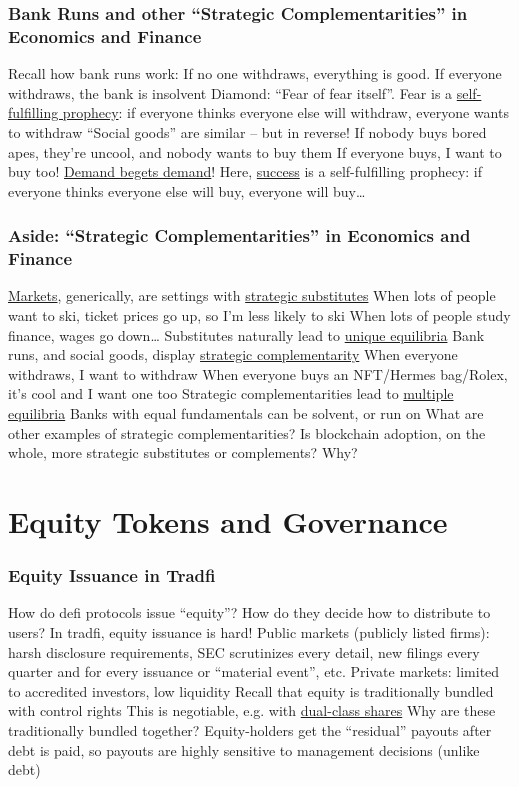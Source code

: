 \documentclass[]{beamer}
\begin{document}
\begin{frame}
\frametitle{Bank Runs and other ``Strategic Complementarities'' in Economics and Finance}

\bi
\m Recall how bank runs work:
\bi
\m If no one withdraws, everything is good. If everyone withdraws, the bank is insolvent
\m Diamond: ``Fear of fear itself''. Fear is a \ul{self-fulfilling prophecy}: if everyone thinks everyone else will withdraw, everyone wants to withdraw 
\ei
\m ``Social goods'' are similar -- but in reverse!
\bi
\m If nobody buys bored apes, they're uncool, and nobody wants to buy them
\m If everyone buys, I want to buy too! \ul{Demand begets demand}! 
\m Here, \ul{success} is a self-fulfilling prophecy: if everyone thinks everyone else will buy, everyone will buy\ldots
\ei
\ei

\end{frame}

\begin{frame}
\frametitle{Aside: ``Strategic Complementarities'' in Economics and Finance}

\bi
\m \ul{Markets}, generically, are settings with \ul{strategic substitutes}
\bi
\m When lots of people want to ski, ticket prices go up, so I'm less likely to ski
\m When lots of people study finance, wages go down\ldots
\ei
\m Substitutes naturally lead to \ul{unique equilibria} \pause
\m Bank runs, and social goods, display \ul{strategic complementarity}
\bi
\m When everyone withdraws, I want to withdraw
\m When everyone buys an NFT/Hermes bag/Rolex, it's cool and I want one too
\ei\pause
\m Strategic complementarities lead to \ul{multiple equilibria}
\bi
\m Banks with equal fundamentals can be solvent, or run on
\ei \pause
\m What are other examples of strategic complementarities? \pause
\m Is blockchain adoption, on the whole, more strategic substitutes or complements? Why?
\ei

\end{frame}





\section{Equity Tokens and Governance}


\begin{frame}
\frametitle{Equity Issuance in Tradfi}

\bi
\m How do defi protocols issue ``equity''? How do they decide how to distribute to users? \pause
\m In tradfi, equity issuance is hard!
\bi
\m Public markets (publicly listed firms): harsh disclosure requirements, SEC scrutinizes every detail, new filings every quarter and for every issuance or ``material event'', etc. 
\m Private markets: limited to accredited investors, low liquidity  
\ei 
\m Recall that equity is traditionally bundled with control rights 
\bi 
\m This is negotiable, e.g. with \href{https://www.sciencedirect.com/science/article/pii/S0304405X21005407}{dual-class shares}
\m Why are these traditionally bundled together? \pause 
\m Equity-holders get the ``residual'' payouts after debt is paid, so payouts are highly sensitive to management decisions (unlike debt) 
\ei
\ei
\end{frame}
\end{document}
